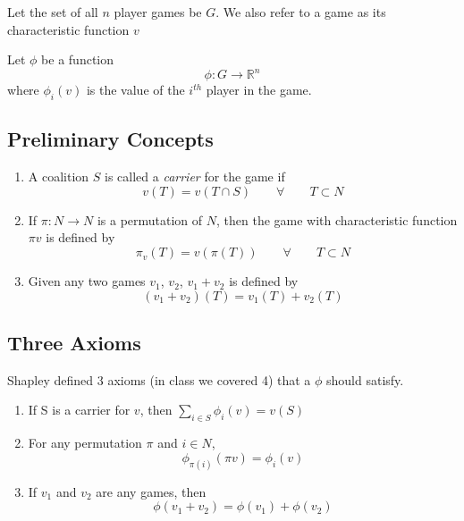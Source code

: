 \documentclass[
paper=128mm:96mm, %
fontsize=11pt, %
pagesize, %
parskip=half-, %
]{scrartcl} %
\theoremstyle{mythmstyle} %
\begin{document}
Let the set of all $n$ player games be $G$. We also refer to a game as its characteristic function $v$

Let $\phi$ be a function
\[ \phi: G \rightarrow \mathbb{R}^{n} \]
where $\phi_{i}(v)$ is the value of the $i^{th}$ player in the game.

\clearpage

\subsection{Preliminary Concepts}

\begin{enumerate}
\item A coalition $S$ is called a \emph{carrier} for the game if
	\[ v(T) = v(T \cap S) \qquad \forall \qquad T \subset N \]
    
\item If $\pi: N \rightarrow N$ is a permutation of $N$, then the game with characteristic function $\pi v$ is defined by
	\[ \pi_{v}(T) = v(\pi(T)) \qquad \forall \qquad T \subset N \]
    
\item Given any two games $v_{1}$, $v_{2}$,  $v_{1} + v_{2}$ is defined by
	\[ (v_{1} + v_{2})(T) = v_{1}(T) + v_{2}(T) \]
\end{enumerate}

\clearpage

\subsection{Three Axioms}

Shapley defined 3 axioms (in class we covered 4) that a $\phi$ should satisfy. 
\begin{enumerate}
\item If S is a carrier for $v$, then $\sum_{i \in S}{\phi_{i}(v)} = v(S)$
    
\item For any permutation $\pi$ and $i \in N$,
	\[ \phi_{\pi(i)}(\pi v) = \phi_{i}(v) \]
    
\item If $v_{1}$ and $v_{2}$ are any games, then
	\[ \phi(v_{1} + v_{2}) = \phi(v_{1}) + \phi(v_{2}) \]
\end{enumerate}

\clearpage
\end{document}
